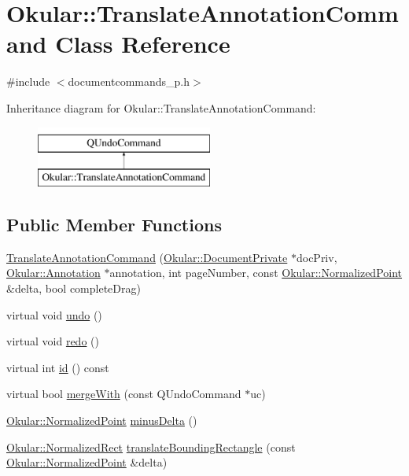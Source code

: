 \hypertarget{classOkular_1_1TranslateAnnotationCommand}{\section{Okular\+:\+:Translate\+Annotation\+Command Class Reference}
\label{classOkular_1_1TranslateAnnotationCommand}
}


{\ttfamily \#include $<$documentcommands\+\_\+p.\+h$>$}

Inheritance diagram for Okular\+:\+:Translate\+Annotation\+Command\+:\begin{figure}[H]
\begin{center}
\leavevmode
\includegraphics[height=2.000000cm]{classOkular_1_1TranslateAnnotationCommand}
\end{center}
\end{figure}
\subsection*{Public Member Functions}
\begin{DoxyCompactItemize}
\item 
\hyperlink{classOkular_1_1TranslateAnnotationCommand_a6c050bf1966133d8ada48cb379467467}{Translate\+Annotation\+Command} (\hyperlink{classOkular_1_1DocumentPrivate}{Okular\+::\+Document\+Private} $\ast$doc\+Priv, \hyperlink{classOkular_1_1Annotation}{Okular\+::\+Annotation} $\ast$annotation, int page\+Number, const \hyperlink{classOkular_1_1NormalizedPoint}{Okular\+::\+Normalized\+Point} \&delta, bool complete\+Drag)
\item 
virtual void \hyperlink{classOkular_1_1TranslateAnnotationCommand_a59c237814c185186169297a6e9d65d97}{undo} ()
\item 
virtual void \hyperlink{classOkular_1_1TranslateAnnotationCommand_aab3d9984fbad79778c1e6fdbfaa760d9}{redo} ()
\item 
virtual int \hyperlink{classOkular_1_1TranslateAnnotationCommand_a94f5fa2fe78eb0b174c56bba536f9034}{id} () const 
\item 
virtual bool \hyperlink{classOkular_1_1TranslateAnnotationCommand_a08c608b44726771f15a14d754d2b03b6}{merge\+With} (const Q\+Undo\+Command $\ast$uc)
\item 
\hyperlink{classOkular_1_1NormalizedPoint}{Okular\+::\+Normalized\+Point} \hyperlink{classOkular_1_1TranslateAnnotationCommand_aa72dd06b02d8f54e358aef6749666b42}{minus\+Delta} ()
\item 
\hyperlink{classOkular_1_1NormalizedRect}{Okular\+::\+Normalized\+Rect} \hyperlink{classOkular_1_1TranslateAnnotationCommand_a17f23b2efa81ea8a62a3b7e1d5040b5c}{translate\+Bounding\+Rectangle} (const \hyperlink{classOkular_1_1NormalizedPoint}{Okular\+::\+Normalized\+Point} \&delta)
\end{DoxyCompactItemize}


